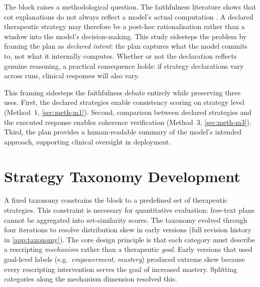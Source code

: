 The  block raises a methodological question. The
faithfulness literature shows that \gls{cot} explanations do not always
reflect a model's actual computation \parencite{TMCBKEVQ, W4K3ARI5}. A
declared therapeutic strategy may therefore be a post-hoc rationalisation
rather than a window into the model's decision-making. This study
sidesteps the problem by framing the plan as \emph{declared intent}: the
plan captures what the model commits to, not what it internally computes.
Whether or not the declaration reflects genuine reasoning, a practical
consequence holds: if strategy declarations vary across runs, clinical
responses will also vary.

This framing sidesteps the faithfulness debate entirely while preserving
three uses. First, the declared strategies enable consistency scoring
on strategy level (Method~1, \autoref{sec:meth-m1}). Second, comparison
between declared strategies and the executed response enables coherence
verification (Method~3, \autoref{sec:meth-m3}). Third, the plan provides
a human-readable summary of the model's intended approach, supporting
clinical oversight in deployment.



\section{Strategy Taxonomy Development}
\label{sec:meth-taxonomy}

A fixed taxonomy constrains the  block to a predefined set
of therapeutic strategies. This constraint is necessary for quantitative
evaluation: free-text plans cannot be aggregated into set-similarity
scores. The taxonomy evolved through four iterations to resolve
distribution skew in early versions (full revision history in
\autoref{app:taxonomy}). The core design principle is that each category
must describe a rescripting \emph{mechanism} rather than a therapeutic
\emph{goal}. Early versions that used goal-level labels (e.g.\
\emph{empowerment}, \emph{mastery}) produced extreme skew because
every rescripting intervention serves the goal of increased mastery.
Splitting categories along the mechanism dimension resolved this.

